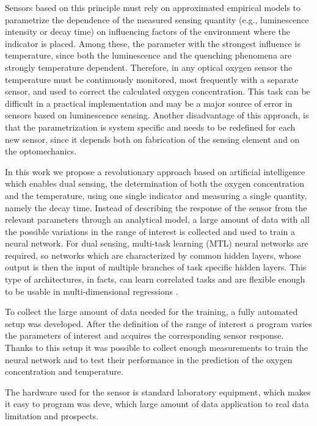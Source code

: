 \documentclass[9pt,twocolumn,twoside,pdftex]{optica}
\begin{document}
Sensors based on this principle must rely on approximated empirical models to parametrize the dependence of the measured sensing quantity (e.g., luminescence intensity or decay time) on influencing factors of the environment where the indicator is placed. Among these, the parameter with the strongest influence is temperature, since both the luminescence and the quenching phenomena are strongly temperature dependent. Therefore, in any optical oxygen sensor the temperature must be continuously monitored, most frequently with a separate sensor, and used to correct the calculated oxygen concentration. This task can be difficult in a practical implementation and may be a major source of error in sensors based on luminescence sensing. Another disadvantage of this approach, is that the parametrization is system specific and needs to be redefined for each new sensor, since it depends both on fabrication of the sensing element \cite{Xu1994,Draxler1995,Hartmann1996,Mills1998,Badocco2008,Dini2011}and on the optomechanics.

In this work we propose a revolutionary approach based on artificial intelligence which enables dual sensing, the determination of both the oxygen concentration and the temperature, using one single indicator and measuring a single quantity, namely the decay time. Instead of describing the response of the sensor from the relevant parameters through an analytical model, a large amount of data with all the possible variations in the range of interest is collected and used to train a neural network. For dual sensing,  multi-task learning (MTL) neural networks are required, so networks which are characterized by common hidden layers, whose output is then the input of multiple branches of task specific hidden layers. This type of architectures, in facts, can learn correlated tasks \cite{Thrun1996, Caruana1997, Zhang2017, Baxter2000, Thung2018} and are flexible enough to be usable in multi-dimensional regressions \cite{Michelucci2019_2}.

To collect the large amount of data needed for the training, a fully automated setup was developed. After the definition of the range of interest a program varies the parameters of interest and acquires the corresponding sensor response. Thanks to this setup it was possible to collect enough measurements to train the neural network and to test their performance in the prediction of the oxygen concentration and temperature.


The hardware used for the sensor is standard laboratory equipment, which makes it easy to 
 program was deve, which 
large amount of data
application to real data 
limitation and prospects.
\end{document}
